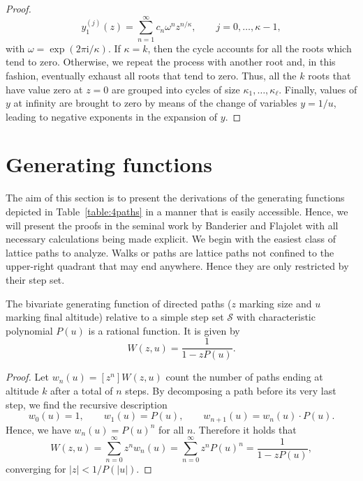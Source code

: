 \begin{proof}
  $$
    y_{1}^{(j)}(z) = \sum\limits_{n=1}^{\infty}c_{n}\omega^n z^{n/\kappa}, \qquad j = 0,\dots,\kappa - 1,
  $$
  with $\omega = \exp(2\pi \mathrm{i}/\kappa)$.
  If $\kappa = k$, then the cycle accounts for all the roots which tend to zero. 
  Otherwise, we repeat the process with another root and, in this fashion, eventually exhaust all roots that tend to zero. 
  Thus, all the $k$ roots that have value zero at $z = 0$ are grouped into cycles of size $\kappa_{1},\dots,\kappa_\ell$.
  Finally, values of $y$ at infinity are brought to zero by means of the change of variables $y = 1/u$, leading to negative exponents in the expansion of $y$.
\end{proof}

\section{Generating functions}
\label{section:generating_functions}

The aim of this section is to present the derivations of the generating functions depicted in Table~\ref{table:4paths} in a manner that is easily accessible. Hence, we will present the proofs in the seminal work \cite{Basic} by Banderier and Flajolet with all necessary calculations being made explicit. 
We begin with the easiest class of lattice paths to analyze. Walks or paths are lattice paths not confined to the upper-right quadrant that may end anywhere. Hence they are only restricted by their step set.

\begin{theorem}
  \label{thm:gf_walks}
  The bivariate generating function of directed paths ($z$ marking size and $u$ marking final altitude) relative to a simple step set $\mathcal{S}$ with characteristic polynomial $P(u)$ is a rational function. It is given by
  $$
    W(z,u) = \frac{1}{1-zP(u)}.
  $$
\end{theorem}

\begin{proof}
  Let $w_n(u) = [z^n]W(z,u)$ count the number of paths ending at altitude $k$ after a total of $n$ steps. By decomposing a path before its very last step, we find the recursive description
  $$
    w_0(u) = 1, \qquad w_1(u) = P(u), \qquad w_{n+1}(u) = w_n(u) \cdot P(u).
  $$
  Hence, we have $w_n(u) = P(u)^n$ for all $n$. Therefore it holds that
  $$
  W(z,u) = \sum_{n = 0}^\infty z^n w_n(u) = \sum_{n=0}^\infty z^nP(u)^n = \frac{1}{1 - zP(u)},
  $$
  converging for $|z| < 1/P(|u|)$.
\end{proof}

